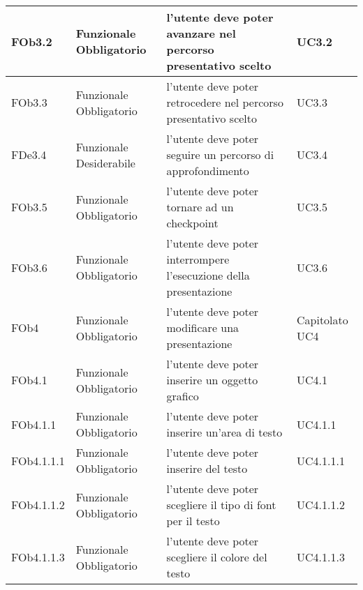 \begin{longtable}{|l|p{2.5cm}|p{5cm}|p{3.5cm}|}
\hline
FOb3.2 & Funzionale \linebreak Obbligatorio & l'utente deve poter avanzare nel percorso presentativo scelto & UC3.2 \linebreak  \\
\hline
FOb3.3 & Funzionale \linebreak Obbligatorio & l'utente deve poter retrocedere nel percorso presentativo scelto & UC3.3 \linebreak  \\
\hline
FDe3.4 & Funzionale \linebreak Desiderabile & l'utente deve poter seguire un percorso di approfondimento & UC3.4 \linebreak  \\
\hline
FOb3.5 & Funzionale \linebreak Obbligatorio & l'utente deve poter tornare ad un checkpoint & UC3.5 \linebreak  \\
\hline
FOb3.6 & Funzionale \linebreak Obbligatorio & l'utente deve poter interrompere l'esecuzione della presentazione & UC3.6 \linebreak  \\
\hline
FOb4 & Funzionale \linebreak Obbligatorio & l'utente deve poter modificare una presentazione & Capitolato \linebreak UC4 \linebreak \\
\hline
FOb4.1 & Funzionale \linebreak Obbligatorio & l'utente deve poter inserire un oggetto grafico & UC4.1 \linebreak  \\
\hline
FOb4.1.1 & Funzionale \linebreak Obbligatorio & l'utente deve poter inserire un'area di testo & UC4.1.1 \linebreak  \\
\hline
FOb4.1.1.1 & Funzionale \linebreak Obbligatorio & l'utente deve poter inserire del testo & UC4.1.1.1 \linebreak  \\
\hline
FOb4.1.1.2 & Funzionale \linebreak Obbligatorio & l'utente deve poter scegliere il tipo di font per il testo & UC4.1.1.2 \linebreak  \\
\hline
FOb4.1.1.3 & Funzionale \linebreak Obbligatorio & l'utente deve poter scegliere il colore del testo & UC4.1.1.3 \linebreak  \\

\end{longtable}
